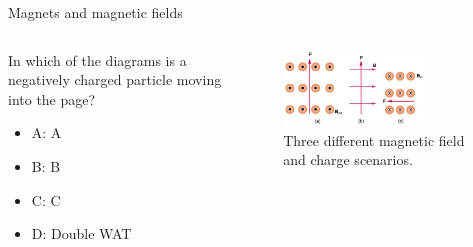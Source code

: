 \documentclass{beamer}
\begin{document}
\begin{frame}{Magnets and magnetic fields}
\begin{columns}[T]
\begin{column}{0.3\textwidth}
In which of the diagrams is a negatively charged particle moving into the page?
\begin{itemize}
\item A: A
\item B: B
\item C: C
\item D: Double WAT
\end{itemize}
\end{column}
\begin{column}{0.7\textwidth}
\begin{figure}
\centering
\includegraphics[width=0.75\textwidth]{figures/lorentzProblem.png}
\caption{\label{fig:lorentzProblem4} Three different magnetic field and charge scenarios.}
\end{figure}
\end{column}
\end{columns}
\end{frame}
\end{document}
